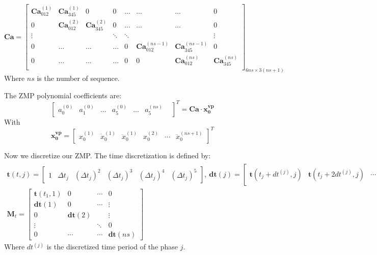 \documentclass[journal]{IEEEtran}
\begin{document}
\begin{equation}
\textbf{Ca}=\begin{bmatrix}
{\textbf{Ca}}^{(1)}_{012} & {\textbf{Ca}}^{(1)}_{345} & 0 & 0 & \ldots & \ldots & \ldots & 0 \\
0 & {\textbf{Ca}}^{(2)}_{012} & {\textbf{Ca}}^{(2)}_{345} & 0  & \ldots & \ldots & \ldots & 0 \\
\vdots & {} & {} & \ddots & \ddots & {} & {} & \vdots\\
0 & \ldots & \ldots & \ldots & 0 & {\textbf{Ca}}^{(ns-1)}_{012} & {\textbf{Ca}}^{(ns-1)}_{345} & 0 \\
0 & \ldots & \ldots & \ldots & 0 & 0 & {\textbf{Ca}}^{(ns)}_{012} & {\textbf{Ca}}^{(ns)}_{345} \\
\end{bmatrix}_{6ns\times 3(ns+1)}
\end{equation}
Where $ns$ is the number of sequence.

The ZMP polynomial coefficients are:
\begin{equation}
\begin{bmatrix}
a_0^{(0)} & a_1^{(0)} &
\ldots &
a_5^{(0)} &
\ldots &
a_5^{(ns)} &
\end{bmatrix}^{T}
=
\textbf{Ca}\cdot\mathbf{x^{vp}_0}
\end{equation}
With
\begin{equation}
\label{eq:viapoint_variables}
\mathbf{x^{vp}_0}=\begin{bmatrix}
x_0^{(1)} &
\dot{x}_0^{(1)} &
\ddot{x}_0^{(1)}&
x_0^{(2)} &
\cdots&
\ddot{x}_0^{(ns+1)}
\end{bmatrix}^{T}
\end{equation}

Now we discretize our ZMP. The time discretization is defined by:
\begin{equation}
\begin{array}{l}
\textbf{t}(t,j)=
\begin{bmatrix}
1 & \Delta t_{j} & (\Delta t_{j})^{2} & (\Delta t_{j})^{3} & (\Delta t_{j})^{4} & (\Delta t_{j})^{5}
\end{bmatrix}, \ \textbf{dt}(j)=
\begin{bmatrix}
\textbf{t}(t_j+dt^{(j)},j) & \textbf{t}(t_j+2dt^{(j)},j) & \cdots & \textbf{t}(t_{j+1},j)
\end{bmatrix}^{T}\\
\textbf{M}_t=
\begin{bmatrix}
\textbf{t}(t_1,1) &  0 & \cdots & 0\\
\textbf{dt}(1) & 0 & \cdots & \vdots\\
0 & \textbf{dt}(2) & {} & \vdots\\
\vdots & {} & \ddots & 0 \\
0 & \cdots &  \cdots & \textbf{dt}(ns) 
\end{bmatrix}
\end{array}
\end{equation}
Where $dt^{(j)}$ is the discretized time period of the phase $j$.
\end{document}
